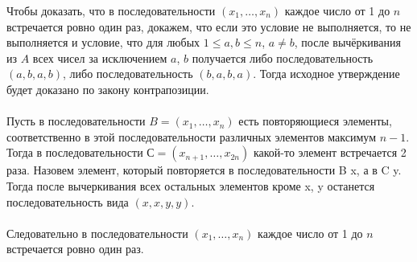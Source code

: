 \documentclass[11pt]{article}
\begin{document}
	Чтобы доказать, что в последовательности $(x_1,\dots, x_n)$ каждое число от 1 до $n$ встречается ровно один раз, докажем, что если это условие не выполняется, то не выполняется и условие, что для любых $1\leq a, b\leq n$, $a\ne b$, после вычёркивания  из $A$ всех чисел за исключением $a$, $b$ получается либо последовательность $(a,b,a,b)$, либо последовательность $(b,a,b,a)$. Тогда исходное утверждение будет доказано по закону контрапозиции.\\\\
	Пусть в последовательности $B = (x_1,\dots, x_n)$ есть повторяющиеся элементы, соответственно в этой последовательности различных элементов максимум $n - 1$. Тогда в последовательности $С = (x_{n + 1},\dots, x_{2n})$ какой-то элемент встречается 2 раза. Назовем элемент, который повторяется в последовательности B x, а в C y. Тогда после вычеркивания всех остальных элементов кроме x, y останется последовательность вида $(x,x,y,y)$. \\
	\\
	Следовательно  в последовательности $(x_1,\dots, x_n)$ каждое число от 1 до $n$ встречается ровно один раз.
	
	
\end{document}
